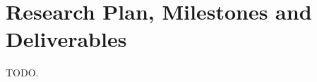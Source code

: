 \documentclass[a4paper,11pt]{article}
\begin{document}
\section{Research Plan, Milestones and Deliverables} \label{milestones}

\par TODO.

    

\end{document}
